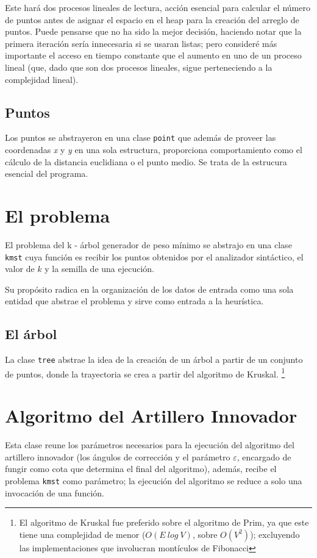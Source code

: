 \documentclass[a4paper]{report}
\begin{document}
  Este har\'a dos procesos lineales de lectura, acci\'on esencial para calcular el n\'umero de
  puntos antes de asignar el espacio en el heap para la creaci\'on del arreglo de puntos.
  Puede pensarse que no ha sido la mejor decisi\'on, haciendo notar que la primera iteraci\'on
  ser\'ia innecesaria si se usaran listas; pero consider\'e m\'as importante el acceso en tiempo
  constante que el aumento en uno de un proceso lineal (que, dado que son dos procesos
  lineales, sigue perteneciendo a la complejidad lineal).

  \subsection{Puntos}
  Los puntos se abstrayeron en una clase \texttt{point} que adem\'as de proveer las coordenadas
  \textit{x} y \textit{y} en una sola estructura, proporciona comportamiento como el c\'alculo
  de la distancia euclidiana o el punto medio. Se trata de la estrucura esencial del programa.

  \section{El problema}
  El problema del k - \'arbol generador de peso m\'inimo se abstrajo en una clase \texttt{kmst}
  cuya funci\'on es recibir los puntos obtenidos por el analizador sint\'actico, el valor de $k$
  y la semilla de una ejecuci\'on.

  Su prop\'osito radica en la organizaci\'on de los datos de entrada como una sola entidad que
  abstrae el problema y sirve como entrada a la heur\'istica.

  \subsection{El \'arbol}
  La clase \texttt{tree} abstrae la idea de la creaci\'on de un \'arbol a partir de un conjunto
  de puntos, donde la trayectoria se crea a partir del algoritmo de Kruskal.
  \footnote{El algoritmo de Kruskal fue preferido sobre el algoritmo de Prim, ya que este
    tiene una complejidad de menor ($O(E \ log \ V)$, sobre $O(V^2)$); excluyendo las
    implementaciones que involucran mont\'iculos de Fibonacci}

  \section{Algoritmo del Artillero Innovador}
  Esta clase reune los par\'ametros necesarios para la ejecuci\'on del algoritmo del artillero
  innovador (los \'angulos de correcci\'on y el par\'ametro $\varepsilon$, encargado de fungir
  como cota que determina el final del algoritmo), adem\'as, recibe el problema \texttt{kmst}
  como par\'ametro; la ejecuci\'on del algoritmo se reduce a solo una invocaci\'on de una
  funci\'on.
\end{document}
